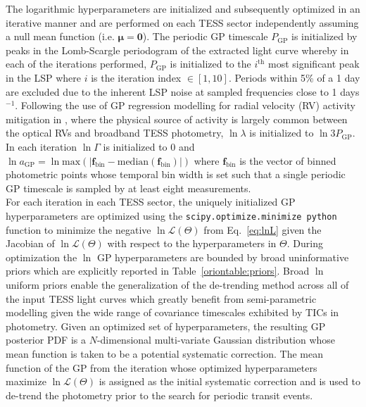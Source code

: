 The logarithmic hyperparameters are initialized and subsequently optimized in an iterative manner and
are performed on each TESS sector independently assuming a null mean function (i.e.
$\boldsymbol{\mu}=\mathbf{0}$).
The periodic GP timescale $P_{\text{GP}}$ is initialized by peaks in the Lomb-Scargle
periodogram \citep[LSP;][]{scargle82} of the extracted light curve whereby in each of the iterations
performed, $P_{\text{GP}}$ is initialized to the $i^{\text{th}}$ most significant peak in the LSP where $i$
is the iteration index $\in [1,10]$. Periods within 5\% of a 1 day are excluded due to the
inherent LSP noise at sampled frequencies close to 1 days$^{-1}$. Following the use of GP regression
modelling for radial velocity (RV) activity mitigation in \cite{dittmann17a}, where the physical source of
activity is largely common between the optical RVs and broadband TESS photometry,  
$\ln{\lambda}$ is initialized to $\ln{3P_{\text{GP}}}$. In each iteration $\ln{\Gamma}$ is initialized to
$0$ and $\ln{a_{\text{GP}}}=\ln{\text{max}(|\mathbf{f}_{\text{bin}} - \text{median}(\mathbf{f}_{\text{bin}})|)}$
where $\mathbf{f}_{\text{bin}}$ is the vector of binned photometric points whose temporal bin width is set
such that a single periodic GP timescale is sampled by at least eight measurements. \\

For each iteration in each TESS sector, the uniquely initialized GP hyperparameters are optimized
using the \texttt{scipy.optimize.minimize python} function to minimize the negative
$\ln{\mathcal{L}(\Theta)}$ from Eq.~\ref{eq:lnL}
given the Jacobian of $\ln{\mathcal{L}(\Theta)}$ with respect to the hyperparameters in
$\Theta$. During optimization the $\ln$ GP hyperparameters are bounded by broad uninformative priors
which are explicitly reported in Table~\ref{oriontable:priors}. Broad $\ln$ uniform priors enable
the generalization of the \pipeline{} de-trending method across all of the input TESS light curves
which greatly benefit from semi-parametric modelling given the wide range of covariance timescales
exhibited by TICs in photometry.
Given an optimized set of hyperparameters, the resulting GP posterior PDF is a $N$-dimensional
multi-variate Gaussian distribution whose mean function is taken to be a potential systematic correction.
The mean function of the GP from the iteration whose optimized hyperparameters maximize
$\ln{\mathcal{L}(\Theta)}$ is assigned as the initial systematic
correction and is used to de-trend the photometry prior to the search for periodic transit events. \\

